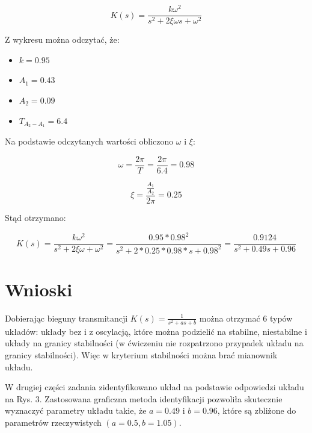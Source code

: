 \documentclass{article}
\begin{document}
\begin{equation}
K(s)=\frac{k \omega^{2}}{s^2+2 \xi \omega s + \omega^2} 
\end{equation}

Z wykresu można odczytać, że:

\begin{itemize}  
	\item \( k = 0.95 \)
	\item \( A_1 = 0.43 \)
	\item \( A_2 = 0.09 \)
	\item \( T_{A_2 - A_1} = 6.4 \)
\end{itemize}

Na podstawie odczytanych wartości obliczono \( \omega \) i \( \xi \):

\begin{equation}
\omega = \frac{ 2 \pi}{T} =  \frac{ 2 \pi}{6.4} = 0.98
\end{equation}

\begin{equation}
\xi = \frac{  \frac{A_1}{A_2} }{2 \pi} = 0.25
\end{equation}

Stąd otrzymano:

\begin{equation}
K(s)=\frac{k \omega^{2}}{s^2+2 \xi \omega + \omega^2}
= \frac{0.95*0.98^2}{s^2+2*0.25* 0.98*s + 0.98^2} = \frac{0.9124}{s^2 + 0.49s + 0.96}
\end{equation}


\section{Wnioski}

Dobierając bieguny transmitancji \(K(s)=\frac{1}{s^2+as+b} \) można otrzymać 6 typów układów: układy bez i z oscylacją, które można podzielić na stabilne, niestabilne i układy na granicy stabilności (w ćwiczeniu nie rozpatrzono przypadek układu na granicy stabilności). Więc w kryterium stabilności można brać mianownik układu.
\par
W drugiej części zadania zidentyfikowano układ na podstawie odpowiedzi układu na Rys. 3. Zastosowana graficzna metoda identyfikacji pozwoliła skutecznie wyznaczyć parametry układu takie, że \( a=0.49 \) i \( b=0.96 \), które są zbliżone do parametrów rzeczywistych \( (a=0.5, b=1.05) \).
\end{document}
